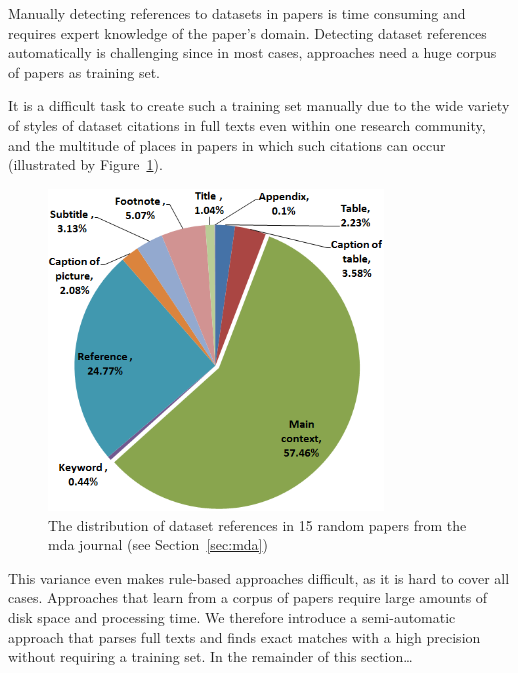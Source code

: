 \documentclass{IOS-Book-Article}
\begin{document}
Manually detecting references to datasets in papers is time consuming and requires expert knowledge of the paper's domain. 
Detecting dataset references automatically is challenging since in most cases, approaches need a huge corpus of papers as training set. 

It is a difficult task to create such a training set manually due to the wide variety of styles of dataset citations in full texts even within one research community, and the multitude of places in papers in which such citations can occur (illustrated by Figure~\ref{fig:places-example}). %

\begin{figure}[h]
	\centering
	\includegraphics[width=3.5in]{DistPlaces3.PNG} 
	\caption{The distribution of dataset references in 15 random papers from the mda journal (see Section~\ref{sec:mda})}
	\label{fig:places-example}
\end{figure}

This variance even makes rule-based approaches difficult, as it is hard to cover all cases. 
Approaches that learn from a corpus of papers require large amounts of disk space and processing time.
We therefore introduce a semi-automatic approach that parses full texts and finds exact matches with a high precision without requiring a training set. 
In the remainder of this section\dots {} 
\end{document}
